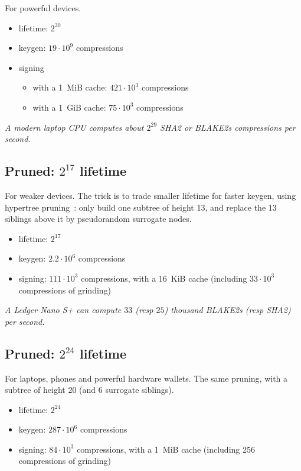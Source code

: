 \documentclass[11pt]{article}
\begin{document}
For powerful devices.

\begin{itemize}
  \item lifetime: $2^{30}$
  \item keygen: $19 \cdot 10^9$ compressions
  \item signing 
    \begin{itemize}
    \item with a 1~MiB cache: $421\cdot10^3$ compressions
    \item with a 1~GiB cache: $75\cdot10^3$ compressions
  \end{itemize}
\end{itemize}

\emph{A modern laptop CPU computes about $2^{29}$ SHA2 or BLAKE2s compressions per second.}


\subsection{Pruned: \texorpdfstring{$2^{17}$}{2\textasciicircum 17} lifetime}\label{sec:pruned}

For weaker devices. The trick is to trade smaller lifetime for faster keygen, using hypertree pruning~\cite{conduition}: only build one subtree of height 13, and replace the 13 siblings above it by pseudorandom surrogate nodes.

\begin{itemize}
  \item lifetime: $2^{17}$
  \item keygen: $2.2\cdot10^6$ compressions
  \item signing: $111\cdot10^3$ compressions, with a 16~KiB cache (including $33\cdot10^3$ compressions of grinding)
\end{itemize}

\emph{A Ledger Nano S+ can compute $33$ (resp $25$) thousand BLAKE2s (resp SHA2) per second.}

\subsection{Pruned: \texorpdfstring{$2^{24}$}{2\textasciicircum 24} lifetime}

For laptops, phones and powerful hardware wallets. The same pruning, with a subtree of height 20 (and 6
surrogate siblings).

\begin{itemize}
  \item lifetime: $2^{24}$
  \item keygen: $287\cdot10^6$ compressions
  \item signing: $84\cdot10^3$ compressions, with a 1~MiB cache (including 256 compressions of grinding)
\end{itemize}
\end{document}
